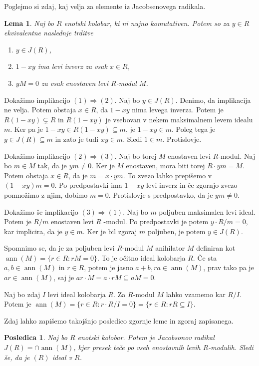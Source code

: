 \documentclass[a4paper, 12pt]{amsart}
\theoremstyle{definition} %
\theoremstyle{plain} %
\newtheorem{lema}[definicija]{Lema}
\newtheorem{posledica}[definicija]{Posledica}
\DeclareMathOperator{\ann}{ann}
\begin{document}
Poglejmo si zdaj, kaj velja za elemente iz Jacobsenovega radikala.
\begin{lema}
\label{J(R)-prvic}
Naj bo $R$ enotski kolobar, ki ni nujno komutativen. Potem so za $y\in R$ ekvivalentne naslednje trditve
 \begin{enumerate}
 \item $y\in J(R)$,
\item $1-xy$ ima levi inverz za vsak $x\in R$,
\item $ yM = 0$ za vsak enostaven levi $R$-modul $M$.
\end{enumerate}
\end{lema}

\proof
Dokažimo implikacijo $(1) \Rightarrow (2)$. Naj bo $y\in J(R)$. Denimo, da implikacija ne velja. Potem obstaja $x\in R$, da $1-xy$ nima levega inverza. Potem je $R(1-xy) \subsetneq R$ in $R(1-xy)$ je vsebovan v nekem maksimalnem levem idealu $m$. Ker pa je $1-xy \in R(1-xy) \subseteq m$, je $1-xy\in m$. Poleg tega je $y\in J(R) \subseteq m$ in zato je tudi $xy \in m$. Sledi $1\in m$. Protislovje.

Dokažimo implikacijo $(2) \Rightarrow (3)$. Naj bo torej $M$ enostaven levi $R$-modul. Naj bo $m\in M$ tak, da je $ym \neq 0$. Ker je $M$ enostaven, mora biti torej $R\cdot ym = M$. Potem obstaja $x\in R$, da je $m = x\cdot ym$. To zvezo lahko prepišemo v $(1-xy)m=0$. Po predpostavki ima $1-xy$ levi inverz in če zgornjo zvezo pomnožimo z njim, dobimo $m=0$. Protislovje s predpostavko, da je $ym\neq 0$.

Dokažimo še implikacijo $(3) \Rightarrow (1)$. Naj bo $m$ poljuben maksimalen levi ideal. Potem je $R/m$ enostaven levi $R$ -modul. Po predpostavki je potem $y  \cdot R/m = 0$, kar implicira, da je $y\in m$. Ker je bil zgoraj $m$ poljuben, je potem $y\in J(R)$.
\endproof

Spomnimo se, da je za poljuben levi $R$-modul $M$ anihilator $M$ definiran kot $\ann(M) = \{r\in R: rM = 0\}$. To je očitno ideal kolobarja $R$. Če sta $a,b\in \ann(M)$ in $r\in R$, potem je jasno $a+b, ra\in \ann(M)$, prav tako pa je $ar\in \ann(M)$, saj je $ar\cdot M = a \cdot rM \subseteq a M =0$.

Naj bo zdaj $I$ levi ideal kolobarja $R$. Za $R$-modul $M$ lahko vzamemo kar $R/I$. Potem je $\ann(M) = \{r\in R: r\cdot R/I = 0\} = \{ r\in R: rR \subseteq I\}$.

Zdaj lahko zapišemo takojšnjo posledico zgornje leme in zgoraj zapisanega. 
\begin{posledica}
\label{J(R)-presekAnihilatorjev}
Naj bo $R$ enotski kolobar. Potem je Jacobsonov radikal $J(R) = \cap \ann(M)$, kjer presek teče po vseh enostavnih levih $R$-modulih. Sledi še, da je $(R)$ ideal v $R$.
\end{posledica}
\end{document}
